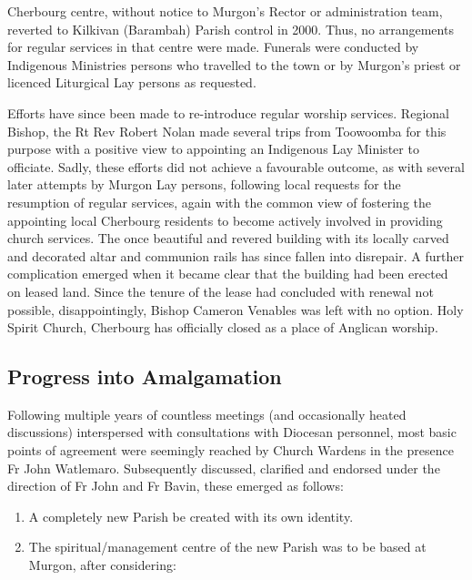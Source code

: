 Cherbourg centre, without notice to Murgon's Rector or administration team, reverted to Kilkivan (Barambah) Parish control in 2000. Thus, no arrangements for regular services in that centre were made. Funerals were conducted by Indigenous Ministries persons who travelled to the town or by Murgon's priest or licenced Liturgical Lay persons as requested.

Efforts have since been made to re-introduce regular worship services. Regional Bishop, the Rt Rev Robert Nolan made several trips from Toowoomba for this purpose with a positive view to appointing an Indigenous Lay Minister to officiate. Sadly, these efforts did not achieve a favourable outcome, as with several later attempts by Murgon Lay persons, following local requests for the resumption of regular services, again with the common view of fostering the appointing local Cherbourg residents to become actively involved in providing church services. The once beautiful and revered building with its locally carved and decorated altar and communion rails has since fallen into disrepair. A further complication emerged when it became clear that the building had been erected on leased land. Since the tenure of the lease had concluded with renewal not possible, disappointingly, Bishop Cameron Venables was left with no option. Holy Spirit Church, Cherbourg has officially closed as a place of Anglican worship.

\hypertarget{progress-into-amalgamation}{%
\subsection{Progress into Amalgamation}\label{progress-into-amalgamation}}

Following multiple years of countless meetings (and occasionally heated discussions) interspersed with consultations with Diocesan personnel, most basic points of agreement were seemingly reached by Church Wardens in the presence Fr John Watlemaro. Subsequently discussed, clarified and endorsed under the direction of Fr John and Fr Bavin, these emerged as follows:

\begin{enumerate}
\def\labelenumi{\arabic{enumi}.}
\item
  A completely new Parish be created with its own identity.
\item
  The spiritual/management centre of the new Parish was to be based at Murgon, after considering:
\end{enumerate}

